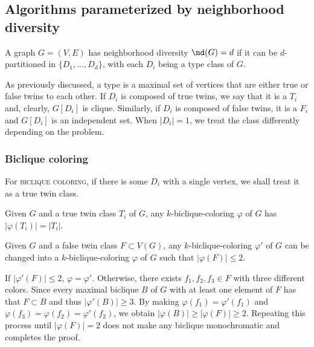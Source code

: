 \subsection{Algorithms parameterized by neighborhood diversity}

\begin{definition}
    A graph $G = (V,E)$ has neighborhood diversity $\nd(G) = d$ if it can be $d$-partitioned in $\{D_1, \dots, D_d\}$, with each $D_i$ being a type class of $G$.
\end{definition}

As previously discussed, a type is a maximal set of vertices that are either true or false twins to each other.
If $D_i$ is composed of true twins, we say that it is a  $T_i$ and, clearly, $G[D_i]$ is clique.
Similarly, if $D_i$ is composed of false twins, it is a  $F_i$ and $G[D_i]$ is an independent set.
When $|D_i| = 1$, we treat the class differently depending on the problem.

\subsubsection{Biclique coloring}

For \textsc{biclique coloring}, if there is some $D_i$ with a single vertex, we shall treat it as a true twin class.

\begin{observation}
    \label{obs:biclique_true_twins}
    Given $G$ and a true twin class $T_i$ of $G$, any $k$-biclique-coloring $\varphi$ of $G$ has $|\varphi(T_i)| = |T_i|$.
\end{observation}

\begin{lemma}
    \label{lem:biclique_false_twins}
    Given $G$ and a false twin class $F \subset V(G)$, any  $k$-biclique-coloring $\varphi'$ of $G$ can be changed into a $k$-biclique-coloring $\varphi$ of $G$ such that $|\varphi(F)| \leq 2$.
\end{lemma}

\begin{tproof}
    If $|\varphi'(F)| \leq 2$, $\varphi = \varphi'$.
    Otherwise, there exists $f_1, f_2, f_3 \in F$ with three different colors. 
    Since every maximal biclique $B$ of $G$ with at least one element of $F$ has that $F \subset B$ and thus $|\varphi'(B)| \geq 3$.
    By making $\varphi(f_1) = \varphi'(f_1)$ and $\varphi(f_3) = \varphi(f_2) = \varphi'(f_2)$, we obtain $|\varphi(B)| \geq |\varphi(F)| \geq 2$.
    Repeating this process until $|\varphi(F)| = 2$ does not make any biclique monochromatic and completes the proof.
\end{tproof}

